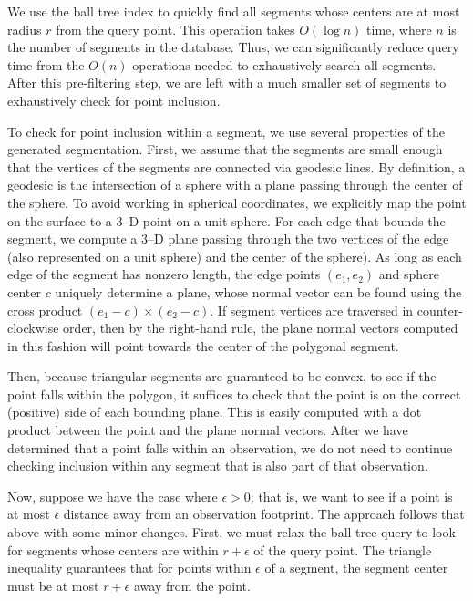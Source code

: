 \documentclass[twocolumn]{extarticle}
\begin{document}
We use the ball tree index to quickly find all segments whose centers are at
most radius $r$ from the query point. This operation takes $O(\log n)$ time,
where $n$ is the number of segments in the database. Thus, we can significantly
reduce query time from the $O(n)$ operations needed to exhaustively search all
segments. After this pre-filtering step, we are left with a much smaller set of
segments to exhaustively check for point inclusion.

To check for point inclusion within a segment, we use several properties of the
generated segmentation. First, we assume that the segments are small enough that
the vertices of the segments are connected via geodesic lines. By definition, a
geodesic is the intersection of a sphere with a plane passing through the
center of the sphere. To avoid working in spherical coordinates, we explicitly
map the point on the surface to a 3--D point on a unit sphere. For each edge
that bounds the segment, we compute a 3--D plane passing through the two
vertices of the edge (also represented on a unit sphere) and the center of the
sphere). As long as each edge of the segment has nonzero length,
the edge points $(e_1, e_2)$ and sphere center $c$ uniquely determine a plane,
whose normal vector can be found using the cross product $(e_1 - c)\times (e_2 -
c)$. If segment vertices are traversed in counter-clockwise order, then by the
right-hand rule, the plane normal vectors computed in this fashion will point
towards the center of the polygonal segment.

Then, because triangular segments are guaranteed to be convex, to see
if the point falls within the polygon, it suffices to check that the point is on
the correct (positive) side of each bounding plane. This is easily computed with
a dot product between the point and the plane normal vectors. After we have
determined that a point falls within an observation, we do not need to continue
checking inclusion within any segment that is also part of that observation.

Now, suppose we have the case where $\epsilon > 0$; that is, we want to see if a
point is at most $\epsilon$ distance away from an observation footprint. The
approach follows that above with some minor changes. First, we must relax the
ball tree query to look for segments whose centers are within $r + \epsilon$ of
the query point. The triangle inequality guarantees that for points within
$\epsilon$ of a segment, the segment center must be at most $r + \epsilon$ away
from the point.
\end{document}
